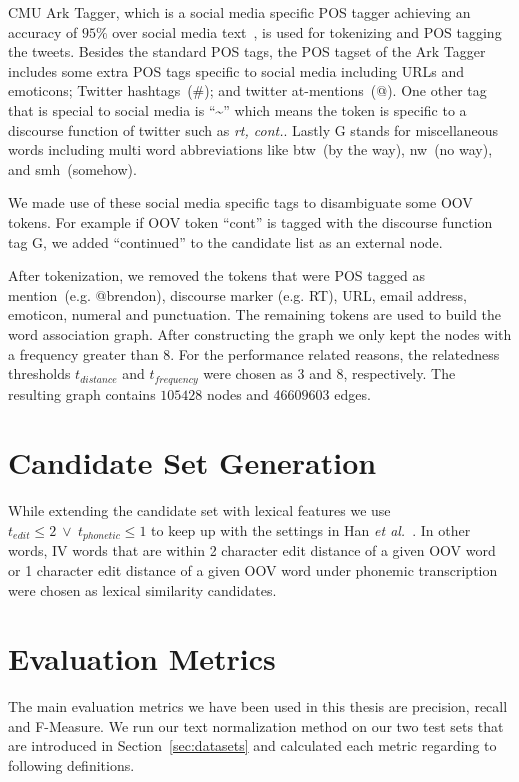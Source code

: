\documentclass[a4paper,onesided,12pt]{report}
\begin{document}
CMU Ark Tagger, which is a social media specific POS tagger achieving an accuracy of $95\%$ over social media text~\cite{owoputi2013improved,Gimpel:2011:PTT:2002736.2002747}, is used for tokenizing and POS tagging the tweets. Besides the standard POS tags, the POS tagset of the Ark Tagger includes some extra POS tags specific to social media including URLs and emoticons; Twitter hashtags~(\#); and twitter at-mentions~(@). One other tag that is special to social media is ``\textasciitilde'' which means the token is specific to a discourse function of twitter such as \textit{rt, cont.}. Lastly G stands for miscellaneous words including multi word abbreviations like btw~(by the way), nw~(no way), and smh~(somehow).

We made use of these social media specific tags to disambiguate some OOV tokens. For example if OOV token ``cont'' is tagged with the discourse function tag G, we added ``continued'' to the candidate list as an external node.

After tokenization, we removed the tokens that were POS tagged as mention~(e.g. @brendon), discourse marker (e.g. RT), URL, email address, emoticon, numeral and punctuation. The remaining tokens are used to build the word association graph. After constructing the graph we only kept the nodes with a frequency greater than $8$. For the performance related reasons, the relatedness thresholds $t_{distance}$ and $t_{frequency}$  were chosen as $3$ and $8$, respectively. The resulting graph contains $105428$ nodes and $46609603$ edges.

\section{Candidate Set Generation}

While extending the candidate set with lexical features we use ${t_{edit}\leq 2}~\vee~{t_{phonetic} \leq 1}$ to keep up with the settings in Han \textit{et al.}~\cite{Han:2011:LNS:2002472.2002520}. In other words, IV words that are within 2 character edit distance of a given OOV word or 1 character edit distance of a given OOV word under phonemic transcription were chosen as lexical similarity candidates.

\section{Evaluation Metrics}

The main evaluation metrics we have been used in this thesis are precision, recall and F-Measure. We run our text normalization method on our two test sets that are introduced in Section~\ref{sec:datasets} and calculated each metric regarding to following definitions.
\end{document}
